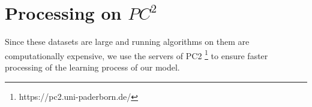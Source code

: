 \section{Processing on $PC^2$}
\label{sec:processing_on_pc2}


Since these datasets are large and running algorithms on them are computationally expensive, we use the servers of \ac{PC2} \footnote{https://pc2.uni-paderborn.de/} to ensure faster processing of the learning process of our model.





